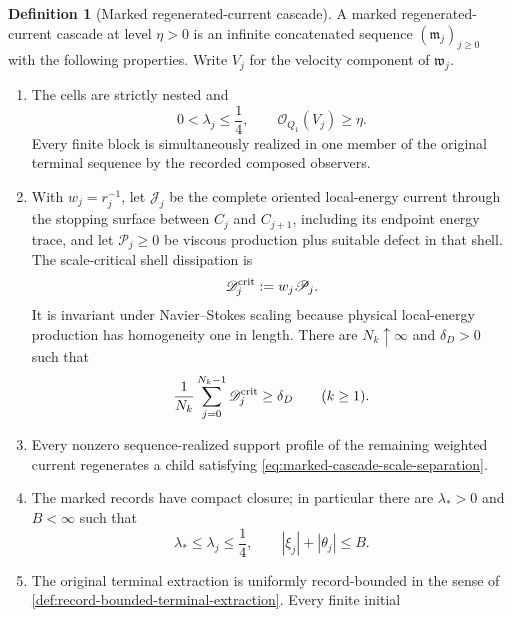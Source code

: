 \documentclass[11pt]{amsart}
\numberwithin{equation}{section}
\theoremstyle{plain}
\theoremstyle{definition}
\newtheorem{definition}[definition]{Definition}
\theoremstyle{remark}
\begin{document}
\begin{definition}[Marked regenerated-current cascade]
\label{def:marked-regenerated-cascade}
A marked regenerated-current cascade at level \(\eta>0\) is an infinite
concatenated sequence \((\mathfrak m_j)_{j\ge0}\) with the following
properties.  Write \(V_j\) for the velocity component of \(\mathfrak w_j\).
\begin{enumerate}[label=\textup{(R\arabic*)},leftmargin=2.8em]
\item The cells are strictly nested and
\begin{equation}\label{eq:marked-cascade-scale-separation}
 0<\lambda_j\le\frac14,
 \qquad
 \mathcal O_{Q_1}(V_j)\ge\eta .
\end{equation}
Every finite block is simultaneously realized in one member of the original
terminal sequence by the recorded composed observers.
\item With \(w_j=r_j^{-1}\), let \(\mathscr J_j\) be the complete oriented
local-energy current through the stopping surface between \(C_j\) and
\(C_{j+1}\), including its endpoint energy trace, and let
\(\mathscr P_j\ge0\) be viscous production plus suitable defect in that shell.
The scale-critical shell dissipation is
\begin{equation}\label{eq:marked-critical-dissipation}
 \mathscr D_j^{\rm crit}:=w_j\mathscr P_j .
\end{equation}
It is invariant under Navier--Stokes scaling because physical local-energy
production has homogeneity one in length.
There are \(N_k\uparrow\infty\) and \(\delta_D>0\) such that
\begin{equation}\label{eq:marked-positive-cesaro-dissipation}
 \frac1{N_k}\sum_{j=0}^{N_k-1}\mathscr D_j^{\rm crit}\ge\delta_D
 \qquad(k\ge1).
\end{equation}
\item Every nonzero sequence-realized support profile of the remaining
weighted current regenerates a child satisfying
\eqref{eq:marked-cascade-scale-separation}.
\item The marked records have compact closure; in particular there are
\(\lambda_*>0\) and \(B<\infty\)
such that
\begin{equation}\label{eq:compact-mark-bounds}
 \lambda_*\le\lambda_j\le\frac14,
 \qquad |\xi_j|+|\theta_j|\le B.
\end{equation}
\item The original terminal extraction is uniformly record-bounded in the
sense of \cref{def:record-bounded-terminal-extraction}.  Every finite initial

\end{enumerate}
\end{definition}
\end{document}

